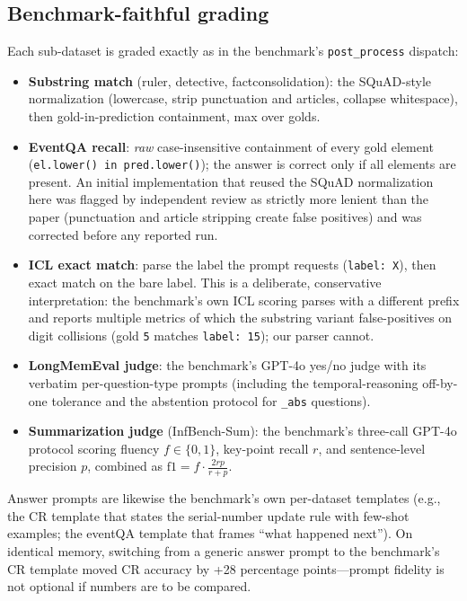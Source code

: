 \documentclass{article}
\begin{document}
\subsection{Benchmark-faithful grading}
Each sub-dataset is graded exactly as in the benchmark's \texttt{post\_process}
dispatch:

\begin{itemize}
  \item \textbf{Substring match} (ruler, detective, factconsolidation): the
        SQuAD-style normalization (lowercase, strip punctuation and articles,
        collapse whitespace), then gold-in-prediction containment, max over
        golds.
  \item \textbf{EventQA recall}: \emph{raw} case-insensitive containment of
        every gold element (\texttt{el.lower() in pred.lower()}); the answer is
        correct only if all elements are present. An initial implementation
        that reused the SQuAD normalization here was flagged by independent
        review as strictly more lenient than the paper (punctuation and
        article stripping create false positives) and was corrected before any
        reported run.
  \item \textbf{ICL exact match}: parse the label the prompt requests
        (\texttt{label:~X}), then exact match on the bare label. This is a
        deliberate, conservative interpretation: the benchmark's own ICL
        scoring parses with a different prefix and reports multiple metrics of
        which the substring variant false-positives on digit collisions
        (gold \texttt{5} matches \texttt{label: 15}); our parser cannot.
  \item \textbf{LongMemEval judge}: the benchmark's GPT-4o yes/no judge with
        its verbatim per-question-type prompts (including the
        temporal-reasoning off-by-one tolerance and the abstention protocol
        for \texttt{\_abs} questions).
  \item \textbf{Summarization judge} (InfBench-Sum): the benchmark's three-call
        GPT-4o protocol scoring fluency $f\in\{0,1\}$, key-point recall $r$,
        and sentence-level precision $p$, combined as
        $\mathrm{f1} = f \cdot \frac{2rp}{r+p}$.
\end{itemize}

Answer prompts are likewise the benchmark's own per-dataset templates (e.g.,
the CR template that states the serial-number update rule with few-shot
examples; the eventQA template that frames ``what happened next''). On
identical memory, switching from a generic answer prompt to the benchmark's CR
template moved CR accuracy by +28 percentage points---prompt fidelity is not
optional if numbers are to be compared.
\end{document}
